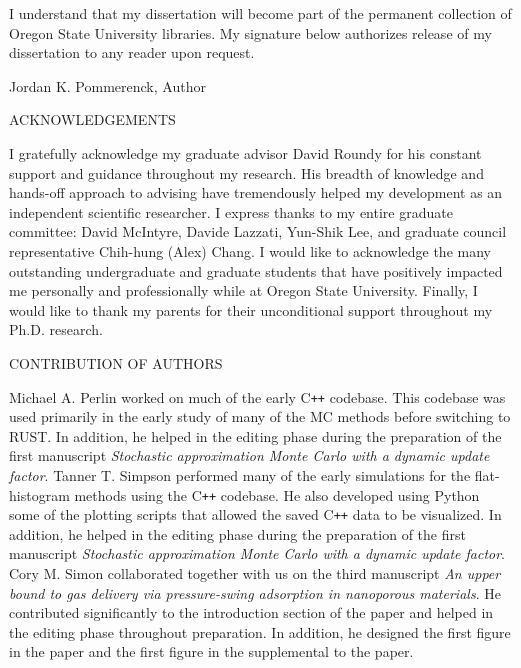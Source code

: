 \vspace{3.0cm}
\justify{}
I understand that my dissertation will become part of the permanent collection
of Oregon State University libraries. My signature below authorizes release of my dissertation to any reader upon request. \\
\vspace{0.5cm}
\begin{flushleft}
\underline{\hspace{15cm}}
\end{flushleft}
\centering{}
Jordan K. Pommerenck, Author

\newpage{}
\thispagestyle{empty}
\begin{center}
	\large
	ACKNOWLEDGEMENTS
\end{center}
\justify{}
\doublespacing
I gratefully acknowledge my graduate advisor David Roundy for his
constant support and guidance throughout my research. His breadth of knowledge
and hands-off approach to advising have tremendously helped my development as an independent scientific researcher. I express thanks to my entire graduate committee: David McIntyre, Davide Lazzati, Yun-Shik Lee, and graduate council representative Chih-hung (Alex) Chang.
I would like to acknowledge the many outstanding undergraduate and graduate students that have positively impacted me personally and professionally while at Oregon State University. Finally, I would like to thank my parents for their unconditional support throughout my Ph.D. research.

\newpage{}
\thispagestyle{empty}
\begin{center}
	\large
	CONTRIBUTION OF AUTHORS
\end{center}
\justify{}
\doublespacing
Michael A. Perlin worked on much of the early C{}\verb!++! codebase. This codebase was used primarily in the early study of many of the MC methods before switching to RUST. In addition, he helped in the editing phase during the preparation of the first manuscript \emph{Stochastic approximation Monte Carlo with a dynamic update factor}. 
Tanner T. Simpson performed many of the early simulations for the flat-histogram methods using the C{}\verb!++! codebase. He also developed using Python some of the plotting scripts that allowed the saved C{}\verb!++! data to be visualized. In addition, he helped in the editing phase during the preparation of the first manuscript \emph{Stochastic approximation Monte Carlo with a dynamic update factor}.
Cory M. Simon collaborated together with us on the third manuscript \emph{An upper bound to gas delivery via pressure-swing adsorption in nanoporous materials}. He contributed significantly to the introduction section of the paper and helped in the editing phase throughout preparation. In addition, he designed the first figure in the paper and the first figure in the supplemental to the paper. 
